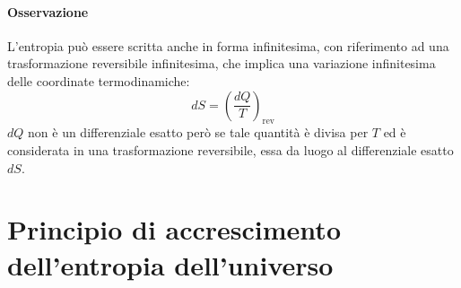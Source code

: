 \documentclass[10pt,a4paper]{book}
\begin{document}
\paragraph{Osservazione} L'entropia può essere scritta anche in forma infinitesima, con riferimento ad una trasformazione reversibile infinitesima, che implica una variazione infinitesima delle coordinate termodinamiche:
\[
	dS = \left( \frac{dQ}{T} \right)_{\text{rev}}
\]
$dQ$ non è un differenziale esatto però se tale quantità è divisa per $T$ ed è considerata in una trasformazione reversibile, essa da luogo al differenziale esatto $dS$.







































\section{Principio di accrescimento dell'entropia dell'universo}
\end{document}
